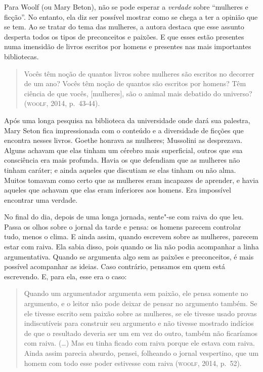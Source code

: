 Para Woolf (ou Mary Beton), não se pode esperar a \emph{verdade} sobre
``mulheres e ficção''. No entanto, ela diz ser possível mostrar como se
chega a ter a opinião que se tem. Ao se tratar do tema das mulheres, a
autora destaca que esse assunto desperta todos os tipos de preconceitos
e paixões. E que esses estão presentes numa imensidão de livros escritos
por homens e presentes nas mais importantes bibliotecas.

\begin{quote}
Vocês têm noção de quantos livros sobre mulheres são escritos no
decorrer de um ano? Vocês têm noção de quantos são escritos por homens?
Têm ciência de que vocês, {[}mulheres{]}, são o animal mais debatido do
universo? (\textsc{woolf}, 2014, p.~43-44).
\end{quote}

Após uma longa pesquisa na biblioteca da universidade onde dará sua
palestra, Mary Seton fica impressionada com o conteúdo e a diversidade
de ficções que encontra nesses livros. Goethe honrava as mulheres;
Mussolini as desprezava. Alguns achavam que elas tinham um cérebro mais
superficial, outros que sua consciência era mais profunda. Havia os que
defendiam que as mulheres não tinham caráter; e ainda aqueles que
discutiam se elas tinham ou não alma. Muitos tomavam como certo que as
mulheres eram incapazes de aprender, e havia aqueles que achavam que
elas eram inferiores aos homens. Era impossível encontrar uma verdade.

No final do dia, depois de uma longa jornada, sente"-se com raiva do
que leu. Passa os olhos sobre o jornal da tarde e pensa: os homens
parecem controlar tudo, menos o clima. E ainda assim, quando escrevem
sobre as mulheres, parecem estar com raiva. Ela sabia disso,
pois quando os lia não podia acompanhar a linha argumentativa. Quando se
argumenta algo sem as paixões e preconceitos, é mais possível acompanhar
as ideias. Caso contrário, pensamos em quem está escrevendo. E, para
ela, esse era o caso:

\begin{quote}
Quando um argumentador argumenta sem paixão, ele pensa somente no
argumento, e o leitor não pode deixar de pensar no argumento também. Se
ele tivesse escrito sem paixão sobre as mulheres, se ele tivesse usado
provas indiscutíveis para construir seu argumento e não tivesse mostrado
indícios de que o resultado deveria ser um em vez do outro, também não
ficaríamos com raiva. (\ldots{}) Mas eu tinha ficado com raiva porque ele
estava com raiva. Ainda assim parecia absurdo, pensei, folheando o
jornal vespertino, que um homem com todo esse poder estivesse com
raiva (\textsc{woolf}, 2014, p.~52).
\end{quote}

